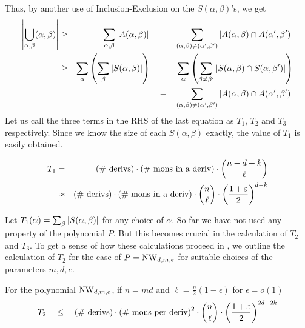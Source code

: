 Thus, by another use of Inclusion-Exclusion on the $S(\alpha, \beta)$'s, we get
\begin{eqnarray*}
\left|\bigcup_{\alpha, \beta}(\alpha,\beta)\right|&\geq& \sum_{\alpha,\beta}\left|A(\alpha, \beta)\right| \quad - \quad \sum_{(\alpha, \beta)\neq (\alpha',\beta')}\left|A(\alpha, \beta) \cap A(\alpha',\beta')\right|\\
 & \geq & \sum_\alpha \left(\sum_\beta \left|S(\alpha, \beta)\right|\right) \quad - \quad \sum_\alpha \left(\sum_{\beta \neq \beta'}\left|S(\alpha, \beta)\cap S(\alpha,\beta')\right|\right)\\
 & & \quad\quad \quad - \quad \sum_{(\alpha, \beta)\neq (\alpha',\beta')}\left|A(\alpha, \beta) \cap A(\alpha',\beta')\right|
\end{eqnarray*}
Let us call the three terms in the RHS of the last equation as $T_1$, $T_2$ and $T_3$ respectively. Since we know the size of each $S(\alpha, \beta)$ exactly, the value of $T_1$ is easily obtained. 
\begin{lemma}[\cite{KS14}]\label{lem:T_1-value}
\begin{eqnarray*}
T_1 &=& \text{(\# derivs)} \cdot \text{(\# mons in a deriv)} \cdot \binom{n-d+k}{\ell}\\
    & \approx & \text{(\# derivs)} \cdot \text{(\# mons in a deriv)} \cdot \binom{n}{\ell} \cdot \left(\frac{1+\varepsilon}{2}\right)^{d-k}\\
\end{eqnarray*}
\end{lemma}
Let $T_1(\alpha) =\sum_\beta \left|S(\alpha, \beta)\right|$ for any choice of $\alpha$. 
So far we have not used any property of the polynomial $P$. But this becomes crucial in the calculation of $T_2$ and $T_3$. To get a sense of how these calculations proceed in \cite{KS14}, we outline the calculation of $T_2$ for the case of $P = \mathrm{NW}_{d,m,e}$ for suitable choices of the parameters $m,d,e$. 
\begin{lemma}[\cite{KS14}]\label{lem:T_2-for-NW}
For the polynomial $\mathrm{NW}_{d,m,e}$, if $n = md$ and $\ell = \frac{n}{2}(1 - \epsilon)$ for $\epsilon = o(1)$
\[
T_2 \quad \leq \quad\text{(\# derivs)} \cdot \text{(\# mons per deriv)}^2\cdot \binom{n}{\ell} \cdot \left(\frac{1+\varepsilon}{2}\right)^{2d -2k}
\]
\end{lemma}

